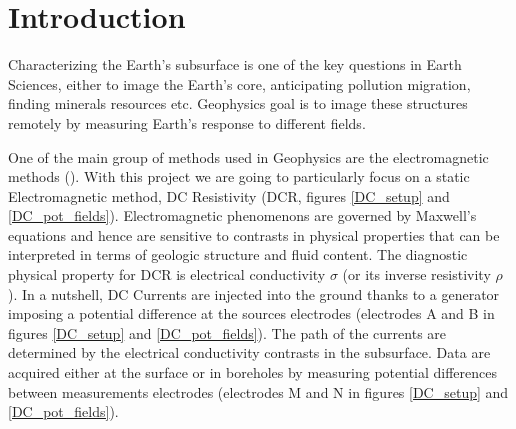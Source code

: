 \documentclass[twoside]{article}
\begin{document}


\section{Introduction}

Characterizing the Earth's subsurface is one of the key questions in Earth Sciences, either to image the Earth's core, anticipating pollution migration, finding minerals resources etc. Geophysics goal is to image these structures remotely by measuring Earth's response to different fields. 

One of the main group of methods used in Geophysics are the electromagnetic methods (\cite{WH:1988}). With this project we are going to particularly focus on a static Electromagnetic method, DC Resistivity (DCR, figures \ref{DC_setup} and \ref{DC_pot_fields}). Electromagnetic phenomenons are governed by Maxwell's equations and hence are sensitive to contrasts in physical properties that can be interpreted in terms of geologic structure and fluid content. The diagnostic physical property for DCR is electrical conductivity $\sigma$ (or its inverse resistivity $\rho$). In a nutshell, DC Currents are injected into the ground thanks to a generator imposing a potential difference at the sources electrodes (electrodes A and B in figures \ref{DC_setup} and \ref{DC_pot_fields}). The path of the currents are determined by the electrical conductivity contrasts in the subsurface. Data are acquired either at the surface or in boreholes by measuring potential differences between measurements electrodes (electrodes M and N in figures \ref{DC_setup} and \ref{DC_pot_fields}).
\end{document}
